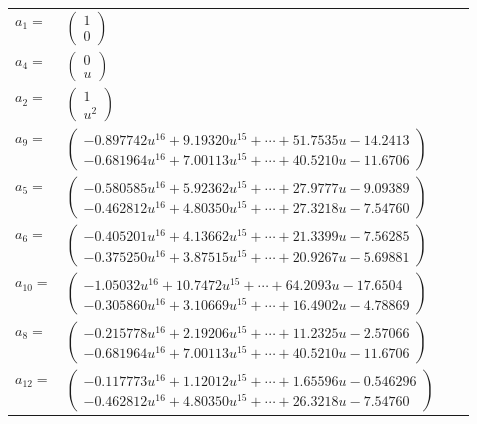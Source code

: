 \documentclass[1p]{elsarticle_modified}
\theoremstyle{definition}
\begin{document}
\begin{tabular}{m{7pt} m{180pt} m{7pt} m{180pt} }
\flushright $a_{1}=$&$\begin{pmatrix}1\\0\end{pmatrix}$ \\
\flushright $a_{4}=$&$\begin{pmatrix}0\\u\end{pmatrix}$ \\
\flushright $a_{2}=$&$\begin{pmatrix}1\\u^2\end{pmatrix}$ \\
\flushright $a_{9}=$&$\begin{pmatrix}-0.897742 u^{16}+9.19320 u^{15}+\cdots+51.7535 u-14.2413\\-0.681964 u^{16}+7.00113 u^{15}+\cdots+40.5210 u-11.6706\end{pmatrix}$ \\
\flushright $a_{5}=$&$\begin{pmatrix}-0.580585 u^{16}+5.92362 u^{15}+\cdots+27.9777 u-9.09389\\-0.462812 u^{16}+4.80350 u^{15}+\cdots+27.3218 u-7.54760\end{pmatrix}$ \\
\flushright $a_{6}=$&$\begin{pmatrix}-0.405201 u^{16}+4.13662 u^{15}+\cdots+21.3399 u-7.56285\\-0.375250 u^{16}+3.87515 u^{15}+\cdots+20.9267 u-5.69881\end{pmatrix}$ \\
\flushright $a_{10}=$&$\begin{pmatrix}-1.05032 u^{16}+10.7472 u^{15}+\cdots+64.2093 u-17.6504\\-0.305860 u^{16}+3.10669 u^{15}+\cdots+16.4902 u-4.78869\end{pmatrix}$ \\
\flushright $a_{8}=$&$\begin{pmatrix}-0.215778 u^{16}+2.19206 u^{15}+\cdots+11.2325 u-2.57066\\-0.681964 u^{16}+7.00113 u^{15}+\cdots+40.5210 u-11.6706\end{pmatrix}$ \\
\flushright $a_{12}=$&$\begin{pmatrix}-0.117773 u^{16}+1.12012 u^{15}+\cdots+1.65596 u-0.546296\\-0.462812 u^{16}+4.80350 u^{15}+\cdots+26.3218 u-7.54760\end{pmatrix}$ \\

\end{tabular}
\end{document}
